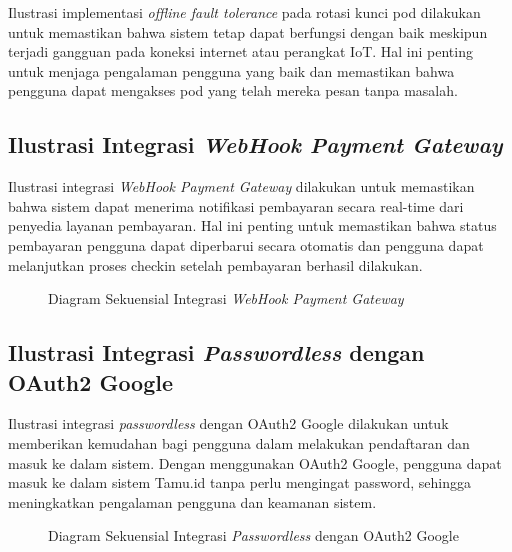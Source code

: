 Ilustrasi implementasi \textit{offline fault tolerance} pada rotasi kunci pod dilakukan untuk memastikan bahwa sistem tetap dapat berfungsi dengan baik meskipun terjadi gangguan pada koneksi internet atau perangkat IoT. Hal ini penting untuk menjaga pengalaman pengguna yang baik dan memastikan bahwa pengguna dapat mengakses pod yang telah mereka pesan tanpa masalah.

\subsection{Ilustrasi Integrasi \textit{WebHook Payment Gateway}}

Ilustrasi integrasi \textit{WebHook Payment Gateway} dilakukan untuk memastikan bahwa sistem dapat menerima notifikasi pembayaran secara real-time dari penyedia layanan pembayaran. Hal ini penting untuk memastikan bahwa status pembayaran pengguna dapat diperbarui secara otomatis dan pengguna dapat melanjutkan proses checkin setelah pembayaran berhasil dilakukan.

\begin{figure}[H]
    \centering
    \caption{Diagram Sekuensial Integrasi \textit{WebHook Payment Gateway}}
    \label{fig:oth_midtrans} %
\end{figure}


\subsection{Ilustrasi Integrasi \textit{Passwordless} dengan OAuth2 Google}

Ilustrasi integrasi \textit{passwordless} dengan OAuth2 Google dilakukan untuk memberikan kemudahan bagi pengguna dalam melakukan pendaftaran dan masuk ke dalam sistem. Dengan menggunakan OAuth2 Google, pengguna dapat masuk ke dalam sistem Tamu.id tanpa perlu mengingat password, sehingga meningkatkan pengalaman pengguna dan keamanan sistem.

\begin{figure}[H]
    \centering
    \caption{Diagram Sekuensial Integrasi \textit{Passwordless} dengan OAuth2 Google}
    \label{fig:oth_oauth} %
\end{figure}

